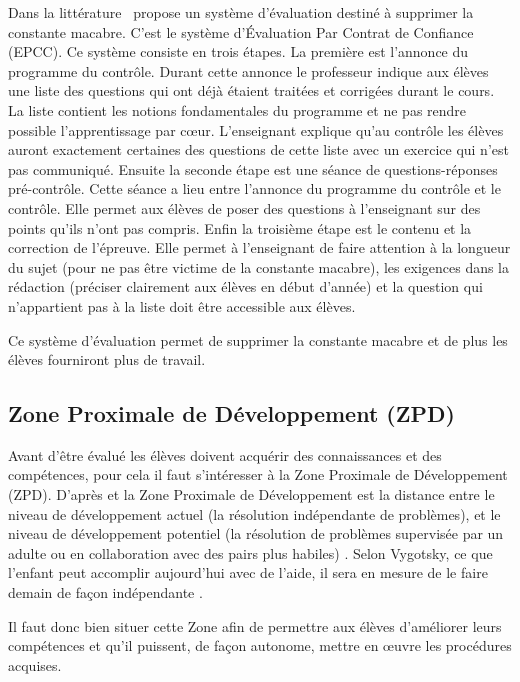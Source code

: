 Dans la littérature~\cite{antibi2007notes} propose un système d'évaluation destiné à supprimer la constante macabre.
C'est le système d'Évaluation Par Contrat de Confiance (EPCC).
Ce système consiste en trois étapes. La première est l'annonce du programme du contrôle.
Durant cette annonce le professeur indique aux élèves une liste des questions qui ont déjà étaient traitées et corrigées durant le cours.
La liste contient les notions fondamentales du programme et ne pas rendre possible l'apprentissage par cœur.
L'enseignant explique qu'au contrôle les élèves auront exactement certaines des questions de cette liste avec un exercice qui n'est pas communiqué.
Ensuite la seconde étape est une séance de questions-réponses pré-contrôle.
Cette séance a lieu entre l'annonce du programme du contrôle et le contrôle.
Elle permet aux élèves de poser des questions à l'enseignant sur des points qu'ils n'ont pas compris.
Enfin la troisième étape est le contenu et la correction de l'épreuve.
Elle permet à l'enseignant de faire attention à la longueur du sujet (pour ne pas être victime de la constante macabre), les exigences dans la rédaction (préciser clairement aux élèves en début d'année) et la question qui n'appartient pas à la liste doit être accessible aux élèves.

Ce système d'évaluation permet de supprimer la constante macabre et de plus les élèves fourniront plus de travail.

\newpage
\subsection{Zone Proximale de Développement (ZPD)}

Avant d'être évalué les élèves doivent acquérir des connaissances et des compétences, pour cela il faut s'intéresser à la Zone Proximale de Développement (ZPD).
D'après \cite{vygotsky1978interaction} et \cite{bodrova2011outils} la Zone Proximale de Développement est \og la distance entre le niveau de développement actuel (la résolution indépendante de problèmes), et le niveau de développement potentiel (la résolution de problèmes supervisée par un adulte ou en collaboration avec des pairs plus habiles) \fg.
 \og Selon Vygotsky, ce que l'enfant peut accomplir aujourd'hui avec de l'aide, il sera en mesure de le faire demain de façon indépendante \fg{} \cite{vygotsky1987zone} \cite{bodrova2011outils}.

Il faut donc bien situer cette Zone afin de permettre aux élèves d'améliorer leurs compétences et qu'il puissent, de façon autonome, mettre en œuvre les procédures acquises.






